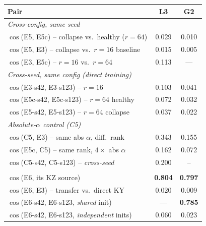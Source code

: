 \documentclass[11pt]{article}
\begin{document}
\begin{table}[!htbp]
\centering
\small
\setlength{\tabcolsep}{6pt}
\begin{tabular}{lcc}
\toprule
\textbf{Pair} & \textbf{L3} & \textbf{G2} \\
\midrule
\multicolumn{3}{l}{\emph{Cross-config, same seed}} \\
$\cos$(E5, E5c) -- collapse vs.\ healthy ($r{=}64$)    & 0.029 & 0.010 \\
$\cos$(E5, E3) -- collapse vs.\ $r{=}16$ baseline      & 0.015 & 0.005 \\
$\cos$(E3, E5c) -- $r{=}16$ vs.\ $r{=}64$              & 0.113 & --- \\
\midrule
\multicolumn{3}{l}{\emph{Cross-seed, same config (direct training)}} \\
$\cos$(E3-s42, E3-s123) -- $r{=}16$                    & 0.103 & 0.041 \\
$\cos$(E5c-s42, E5c-s123) -- $r{=}64$ healthy          & 0.072 & 0.032 \\
$\cos$(E5-s42, E5-s123) -- $r{=}64$ collapse           & 0.037 & 0.022 \\
\midrule
\multicolumn{3}{l}{\emph{Absolute-$\alpha$ control (C5)}} \\
$\cos$(C5, E3) -- same abs $\alpha$, diff.\ rank       & 0.343 & 0.155 \\
$\cos$(E5c, C5) -- same rank, $4\times$ abs $\alpha$   & 0.162 & 0.072 \\
$\cos$(C5-s42, C5-s123) -- \emph{cross-seed}      & 0.200 & -- \\
\midrule
\rowcolor{gray!15}\multicolumn{3}{l}{\emph{Transfer (E6): source-pinning vs.\ canonicality}} \\
\rowcolor{gray!15}$\cos$(E6, its KZ source)                              & \textbf{0.804} & \textbf{0.797} \\
\rowcolor{gray!15}$\cos$(E6, E3) -- transfer vs.\ direct KY              & 0.020 & 0.009 \\
\rowcolor{gray!15}$\cos$(E6-s42, E6-s123, \emph{shared} init)            & ---   & \textbf{0.785} \\
\rowcolor{gray!15}$\cos$(E6-s42, E6-s123, \emph{independent} inits)      & 0.060 & 0.023 \\
\bottomrule
\end{tabular}

\end{table}
\end{document}
